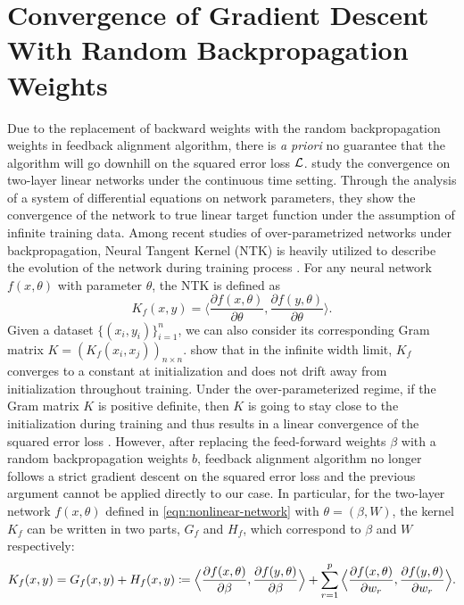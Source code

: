 
\section{Convergence of Gradient Descent With Random Backpropagation Weights}

Due to the replacement of backward weights with the random backpropagation weights in feedback alignment algorithm, there is \emph{a priori} no guarantee that the algorithm will go downhill on the squared error loss $\mathcal{L}$. \citet{lillicrap2020backpropagation} study the convergence on two-layer linear networks under the continuous time setting. Through the analysis of a system of differential equations on network parameters, they show the convergence of the network to true linear target function under the assumption of infinite training data.
Among recent studies of over-parametrized networks under backpropagation, Neural Tangent Kernel (NTK) is heavily utilized to describe the evolution of the network during training process \citep{jacot2018neural}. For any neural network $f(x,\theta)$ with parameter $\theta$, the NTK is defined as
\begin{equation}
	K_f(x,y) = \Big\langle \frac{\partial f (x,\theta)}{\partial \theta},\frac{\partial f (y,\theta)}{\partial \theta}\Big\rangle.
\end{equation}
Given a dataset $\{(x_i,y_i)\}_{i=1}^n$, we can also consider its corresponding Gram matrix $K = (K_f(x_i,x_j))_{n\times n}$. \citet{jacot2018neural} show that in the infinite width limit, $K_f$ converges to a constant at initialization and does not drift away from initialization throughout training. Under the over-parameterized regime, if the Gram matrix $K$ is positive definite, then $K$ is going to stay close to the initialization during training and thus results in a linear convergence of the squared error loss \citep{du2018gradient,du2019gradient,gao2020model}.
However, after replacing the feed-forward weights $\beta$ with a random backpropagation weights $b$, feedback alignment algorithm no longer follows a strict gradient descent on the squared error loss and the previous argument cannot be applied directly to our case. In particular, for the two-layer network $f(x, \theta)$ defined in \eqref{eqn:nonlinear-network} with $\theta = (\beta,W)$, the kernel $K_f$ can be written in two parts, $G_f$ and $H_f$, which correspond to $\beta$ and $W$ respectively:
\begin{equation}
K_f(x,y) = G_f(x, y) + H_f(x,y) \coloneqq \Big\langle \frac{\partial f (x,\theta)}{\partial \beta},\frac{\partial f (y,\theta)}{\partial \beta}\Big\rangle + \sum_{r=1}^p\Big\langle \frac{\partial f (x,\theta)}{\partial w_r},\frac{\partial f (y,\theta)}{\partial w_r}\Big\rangle.
\end{equation}
